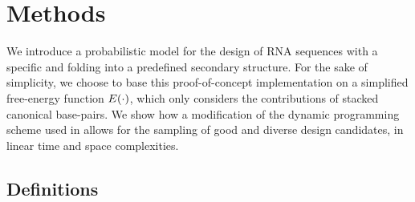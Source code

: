 \section{Methods}
\label{sec:methods}



We introduce a probabilistic model for the design of RNA sequences with a specific \GCContent and folding into a predefined secondary structure.
For the sake of simplicity, we choose to base this proof-of-concept implementation on a simplified free-energy function ${{E}}(\cdot)$, which only considers the contributions of 
stacked canonical base-pairs. We show how a modification of the dynamic programming scheme used in \RNAmutants allows for the sampling of good and diverse design candidates, in linear time and space complexities.


%
%
\subsection{Definitions}

